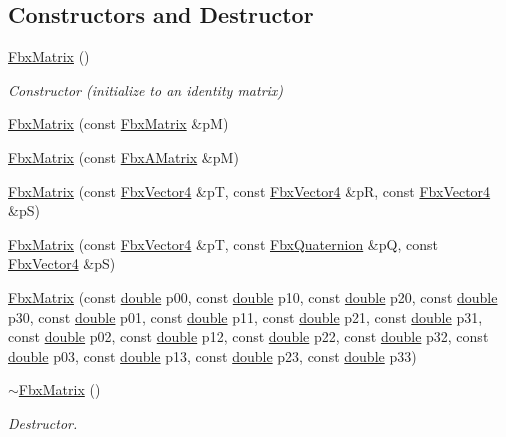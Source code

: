 \subsection*{Constructors and Destructor}
\begin{DoxyCompactItemize}
\item 
\hyperlink{class_fbx_matrix_a06dc051202b75dec9827f9bddaae2007}{Fbx\+Matrix} ()
\begin{DoxyCompactList}\small\item\em Constructor (initialize to an identity matrix) \end{DoxyCompactList}\item 
\hyperlink{class_fbx_matrix_a4f9893c514abe0902a9558f3c28994db}{Fbx\+Matrix} (const \hyperlink{class_fbx_matrix}{Fbx\+Matrix} \&pM)
\item 
\hyperlink{class_fbx_matrix_ae287393a31e964e17b8869355464684a}{Fbx\+Matrix} (const \hyperlink{class_fbx_a_matrix}{Fbx\+A\+Matrix} \&pM)
\item 
\hyperlink{class_fbx_matrix_ac6c1fba6a322eaf372da4e925999b319}{Fbx\+Matrix} (const \hyperlink{class_fbx_vector4}{Fbx\+Vector4} \&pT, const \hyperlink{class_fbx_vector4}{Fbx\+Vector4} \&pR, const \hyperlink{class_fbx_vector4}{Fbx\+Vector4} \&pS)
\item 
\hyperlink{class_fbx_matrix_a9e45338c462c5ca2f2167e24aef42d4e}{Fbx\+Matrix} (const \hyperlink{class_fbx_vector4}{Fbx\+Vector4} \&pT, const \hyperlink{class_fbx_quaternion}{Fbx\+Quaternion} \&pQ, const \hyperlink{class_fbx_vector4}{Fbx\+Vector4} \&pS)
\item 
\hyperlink{class_fbx_matrix_a38ea1e3dfa6b3224134d74ae616e8342}{Fbx\+Matrix} (const \hyperlink{class_fbx_matrix_a01f8be57393e5d9973b23897c29d5520}{double} p00, const \hyperlink{class_fbx_matrix_a01f8be57393e5d9973b23897c29d5520}{double} p10, const \hyperlink{class_fbx_matrix_a01f8be57393e5d9973b23897c29d5520}{double} p20, const \hyperlink{class_fbx_matrix_a01f8be57393e5d9973b23897c29d5520}{double} p30, const \hyperlink{class_fbx_matrix_a01f8be57393e5d9973b23897c29d5520}{double} p01, const \hyperlink{class_fbx_matrix_a01f8be57393e5d9973b23897c29d5520}{double} p11, const \hyperlink{class_fbx_matrix_a01f8be57393e5d9973b23897c29d5520}{double} p21, const \hyperlink{class_fbx_matrix_a01f8be57393e5d9973b23897c29d5520}{double} p31, const \hyperlink{class_fbx_matrix_a01f8be57393e5d9973b23897c29d5520}{double} p02, const \hyperlink{class_fbx_matrix_a01f8be57393e5d9973b23897c29d5520}{double} p12, const \hyperlink{class_fbx_matrix_a01f8be57393e5d9973b23897c29d5520}{double} p22, const \hyperlink{class_fbx_matrix_a01f8be57393e5d9973b23897c29d5520}{double} p32, const \hyperlink{class_fbx_matrix_a01f8be57393e5d9973b23897c29d5520}{double} p03, const \hyperlink{class_fbx_matrix_a01f8be57393e5d9973b23897c29d5520}{double} p13, const \hyperlink{class_fbx_matrix_a01f8be57393e5d9973b23897c29d5520}{double} p23, const \hyperlink{class_fbx_matrix_a01f8be57393e5d9973b23897c29d5520}{double} p33)
\item 
\hyperlink{class_fbx_matrix_ab8028e6c54a9a017cc83a0a3de222275}{$\sim$\+Fbx\+Matrix} ()
\begin{DoxyCompactList}\small\item\em Destructor. \end{DoxyCompactList}\end{DoxyCompactItemize}

